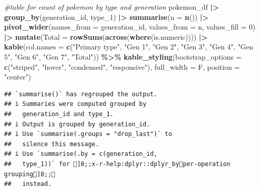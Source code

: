 \documentclass[
]{article}
\newenvironment{Shaded}{\begin{snugshade}}{\end{snugshade}}
\newcommand{\AttributeTok}[1]{\textcolor[rgb]{0.13,0.29,0.53}{#1}}
\newcommand{\CommentTok}[1]{\textcolor[rgb]{0.56,0.35,0.01}{\textit{#1}}}
\newcommand{\DecValTok}[1]{\textcolor[rgb]{0.00,0.00,0.81}{#1}}
\newcommand{\FunctionTok}[1]{\textcolor[rgb]{0.13,0.29,0.53}{\textbf{#1}}}
\newcommand{\NormalTok}[1]{#1}
\newcommand{\SpecialCharTok}[1]{\textcolor[rgb]{0.81,0.36,0.00}{\textbf{#1}}}
\newcommand{\StringTok}[1]{\textcolor[rgb]{0.31,0.60,0.02}{#1}}
\begin{document}
\begin{Shaded}
\begin{Highlighting}[]
\CommentTok{\#table for count of pokemon by type and generation }
\NormalTok{pokemon\_df }\SpecialCharTok{|\textgreater{}} 
  \FunctionTok{group\_by}\NormalTok{(generation\_id, type\_1) }\SpecialCharTok{|\textgreater{}} 
  \FunctionTok{summarise}\NormalTok{(}\AttributeTok{n =} \FunctionTok{n}\NormalTok{()) }\SpecialCharTok{|\textgreater{}} 
  \FunctionTok{pivot\_wider}\NormalTok{(}\AttributeTok{names\_from =}\NormalTok{ generation\_id, }\AttributeTok{values\_from =}\NormalTok{ n, }\AttributeTok{values\_fill =} \DecValTok{0}\NormalTok{) }\SpecialCharTok{|\textgreater{}} 
  \FunctionTok{mutate}\NormalTok{(}\AttributeTok{Total =} \FunctionTok{rowSums}\NormalTok{(}\FunctionTok{across}\NormalTok{(}\FunctionTok{where}\NormalTok{(is.numeric)))) }\SpecialCharTok{|\textgreater{}}
  \FunctionTok{kable}\NormalTok{(}\AttributeTok{col.names =} \FunctionTok{c}\NormalTok{(}\StringTok{"Primary type"}\NormalTok{, }\StringTok{"Gen 1"}\NormalTok{, }\StringTok{"Gen 2"}\NormalTok{, }\StringTok{"Gen 3"}\NormalTok{, }\StringTok{"Gen 4"}\NormalTok{, }\StringTok{"Gen 5"}\NormalTok{, }\StringTok{"Gen 6"}\NormalTok{,}
                      \StringTok{"Gen 7"}\NormalTok{, }\StringTok{"Total"}\NormalTok{)) }\SpecialCharTok{\%\textgreater{}\%}
  \FunctionTok{kable\_styling}\NormalTok{(}\AttributeTok{bootstrap\_options =} \FunctionTok{c}\NormalTok{(}\StringTok{"striped"}\NormalTok{, }\StringTok{"hover"}\NormalTok{, }\StringTok{"condensed"}\NormalTok{, }\StringTok{"responsive"}\NormalTok{),}
                \AttributeTok{full\_width =}\NormalTok{ F, }\AttributeTok{position =} \StringTok{"center"}\NormalTok{)}
\end{Highlighting}
\end{Shaded}

\begin{verbatim}
## `summarise()` has regrouped the output.
## i Summaries were computed grouped by
##   generation_id and type_1.
## i Output is grouped by generation_id.
## i Use `summarise(.groups = "drop_last")` to
##   silence this message.
## i Use `summarise(.by = c(generation_id,
##   type_1))` for ]8;;x-r-help:dplyr::dplyr_byper-operation grouping]8;;
##   instead.
\end{verbatim}
\end{document}
